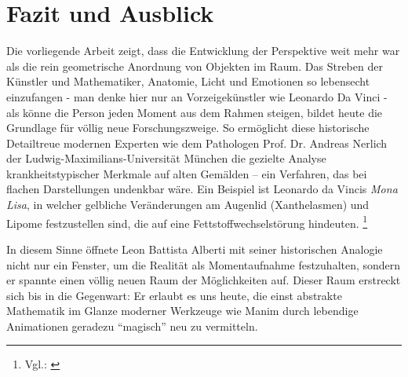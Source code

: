 \section{Fazit und Ausblick}

Die vorliegende Arbeit zeigt, dass die Entwicklung der Perspektive weit mehr war als die rein geometrische Anordnung von Objekten im Raum. Das Streben der Künstler und Mathematiker, Anatomie, Licht und Emotionen so lebensecht einzufangen - man denke hier nur an Vorzeigekünstler wie Leonardo Da Vinci -  als könne die Person jeden Moment aus dem Rahmen steigen, bildet heute die Grundlage für völlig neue Forschungszweige. So ermöglicht diese historische Detailtreue modernen Experten wie dem Pathologen Prof. Dr. Andreas Nerlich der Ludwig-Maximilians-Universität München die gezielte Analyse krankheitstypischer Merkmale auf alten Gemälden -- ein Verfahren, das bei flachen Darstellungen undenkbar wäre. Ein Beispiel ist Leonardo da Vincis \textit{Mona Lisa}, in welcher gelbliche Veränderungen am Augenlid (Xanthelasmen) und Lipome festzustellen sind, die auf eine Fettstoffwechselstörung hindeuten. \footnote{Vgl.: \cite{Morgenpost2026}} 

In diesem Sinne öffnete Leon Battista Alberti mit seiner historischen Analogie nicht nur ein Fenster, um die Realität als Momentaufnahme festzuhalten, sondern er spannte einen völlig neuen Raum der Möglichkeiten auf. Dieser Raum erstreckt sich bis in die Gegenwart: Er erlaubt es uns heute, die einst abstrakte Mathematik im Glanze moderner Werkzeuge wie Manim durch lebendige Animationen geradezu "`magisch"' neu zu vermitteln.